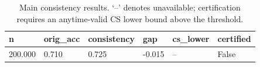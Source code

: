 \begin{table}[t]
\centering
\begin{tabular}{llllll}
\toprule
n & orig_acc & consistency & gap & cs_lower & certified \\
\midrule
200.000 & 0.710 & 0.725 & -0.015 & -- & False \\
\bottomrule
\end{tabular}
\caption{Main consistency results. `--' denotes unavailable; certification requires an anytime-valid CS lower bound above the threshold.}
\end{table}
